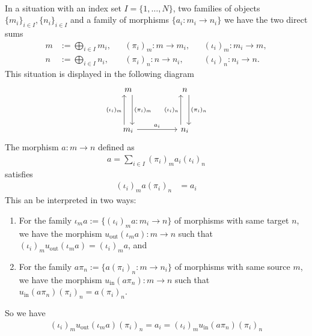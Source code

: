 \begin{example}\phantom{}\label{ex:block_diagonal_matrix}\\
In a situation with an index set $I = \{1,\dots,N\}$, two families of objects $\{m_{i}\}_{i\in I}, \{n_{i}\}_{i\in I}$ and a family of
morphisms $\{a_{i} : m_{i} \rightarrow n_{i}\}$ we have the two direct sums
\begin{align}
m &:= \bigoplus_{i\in I} m_{i}, &&(\pi_{i})_{m} : m \rightarrow m_{i}, &&(\iota_{i})_{m} : m_{i} \rightarrow m, \\
n &:= \bigoplus_{i\in I} n_{i}, &&(\pi_{i})_{n} : n \rightarrow n_{i}, &&(\iota_{i})_{n} : n_{i} \rightarrow n.
\end{align}
This situation is displayed in the following diagram
\[
\begin{tikzcd}
m \arrow[dd, "(\pi_{i})_{m}", shift left=2]                           &  & n \arrow[dd, "(\pi_{i})_{n}", shift left=2]       \\
                                                                      &  &                                                   \\
m_{i} \arrow[uu, "(\iota_{i})_{m}", shift left=2] \arrow[rr, "a_{i}"] &  & n_{i} \arrow[uu, "(\iota_{i})_{n}", shift left=2]
\end{tikzcd}
\]
The morphism $a : m \rightarrow n$ defined as
\begin{align}
a = \sum_{i \in I} (\pi_{i})_{m} a_{i} (\iota_{i})_{n}
\end{align}
satisfies
\begin{align}
(\iota_{i})_{m} a (\pi_{i})_{n} &= a_{i}
\end{align}
This an be interpreted in two ways:
\begin{enumerate}
\renewcommand{\labelenumi}{(\theenumi)}
\item For the family $\iota_{m} a := \{ (\iota_{i})_{m} a : m_{i} \rightarrow n \}$ of morphisms with same target $n$, we have the morphism
$u_{\text{out}}(\iota_{m} a) : m \rightarrow n$ such that $(\iota_{i})_{m} u_{\text{out}}(\iota_{m} a) = (\iota_{i})_{m} a$, and
\item For the family $a \pi_{n} := \{ a (\pi_{i})_{n} : m \rightarrow n_{i} \}$ of morphisms with same source $m$, we have the morphism
$u_{\text{in}}(a \pi_{n}) : m \rightarrow n$ such that $u_{\text{in}}(a \pi_{n}) (\pi_{i})_{n} = a (\pi_{i})_{n}$.
\end{enumerate}
So we have
\begin{align}
(\iota_{i})_{m} u_{\text{out}}(\iota_{m} a) (\pi_{i})_{n} = a_{i} = (\iota_{i})_{m} u_{\text{in}}(a \pi_{n}) (\pi_{i})_{n}
\end{align}
\end{example}


